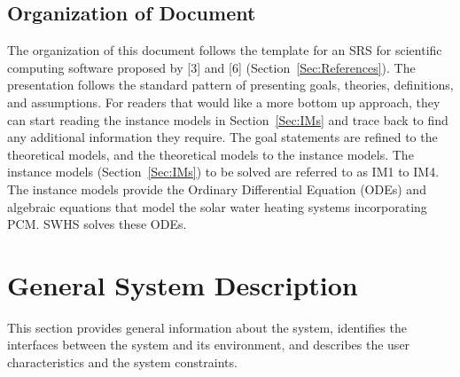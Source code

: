 \documentclass[12pt]{article}
\begin{document}
\subsection{Organization of Document}
\label{Sec:DocOrg}
The organization of this document follows the template for an SRS for scientific computing software proposed by {[}3{]} and {[}6{]} (Section~\ref{Sec:References}). The presentation follows the standard pattern of presenting goals, theories, definitions, and assumptions. For readers that would like a more bottom up approach, they can start reading the instance models in Section~\ref{Sec:IMs} and trace back to find any additional information they require.
The goal statements are refined to the theoretical models, and the theoretical models to the instance models. The instance models (Section~\ref{Sec:IMs}) to be solved are referred to as IM1 to IM4. The instance models provide the Ordinary Differential Equation (ODEs) and algebraic equations that model the solar water heating systems incorporating PCM. SWHS solves these ODEs.
\section{General System Description}
\label{Sec:GenSysDesc}
This section provides general information about the system, identifies the interfaces between the system and its environment, and describes the user characteristics and the system constraints.
\end{document}
